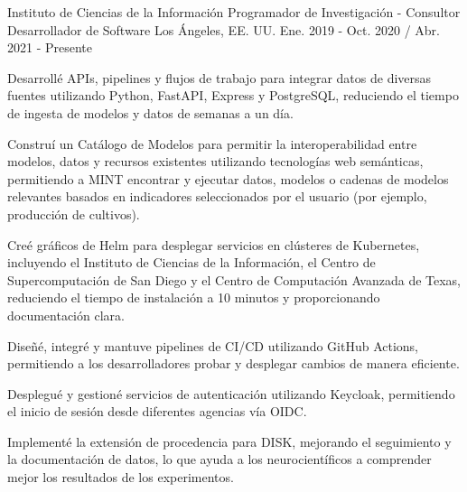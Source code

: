 \begin{cventries}

  \cventry
    {Instituto de Ciencias de la Información}
    {Programador de Investigación - Consultor Desarrollador de Software}
    {Los Ángeles, EE. UU.}
    {Ene. 2019 - Oct. 2020 / Abr. 2021 - Presente}
    {
      \begin{cvitems}
        \item{Desarrollé APIs, pipelines y flujos de trabajo para integrar datos de diversas fuentes utilizando Python, FastAPI, Express y PostgreSQL, reduciendo el tiempo de ingesta de modelos y datos de semanas a un día.}
        \item{Construí un Catálogo de Modelos para permitir la interoperabilidad entre modelos, datos y recursos existentes utilizando tecnologías web semánticas, permitiendo a MINT encontrar y ejecutar datos, modelos o cadenas de modelos relevantes basados en indicadores seleccionados por el usuario (por ejemplo, producción de cultivos).}
        \item{Creé gráficos de Helm para desplegar servicios en clústeres de Kubernetes, incluyendo el Instituto de Ciencias de la Información, el Centro de Supercomputación de San Diego y el Centro de Computación Avanzada de Texas, reduciendo el tiempo de instalación a 10 minutos y proporcionando documentación clara.}
        \item{Diseñé, integré y mantuve pipelines de CI/CD utilizando GitHub Actions, permitiendo a los desarrolladores probar y desplegar cambios de manera eficiente.}
        \item{Desplegué y gestioné servicios de autenticación utilizando Keycloak, permitiendo el inicio de sesión desde diferentes agencias vía OIDC.}
        \item{Implementé la extensión de procedencia para DISK, mejorando el seguimiento y la documentación de datos, lo que ayuda a los neurocientíficos a comprender mejor los resultados de los experimentos.}
      \end{cvitems}
    }


\end{cventries}
